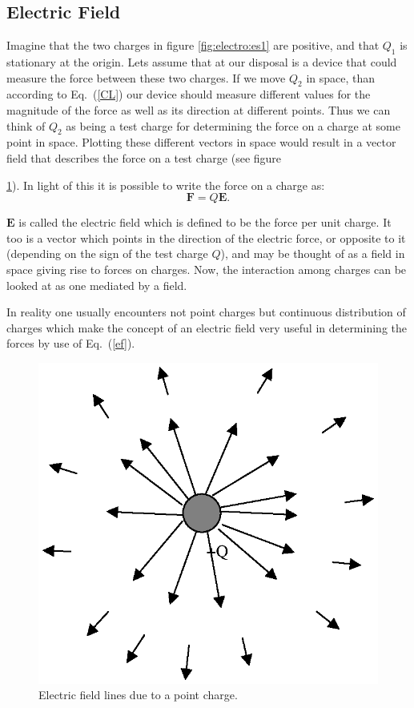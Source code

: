 \subsection{Electric Field}
Imagine that the two charges in figure \ref{fig:electro:es1} are positive, and
that $Q_1$ is stationary at the origin.  Lets assume that at our
disposal is a device that could measure the force between these
two charges. If we move $Q_2$ in space, than according to
Eq.~(\ref{CL}) our device should measure different values for the
magnitude of the force as well as its direction at different
points. Thus we can think of $Q_2$ as being a test charge for
determining the force on a charge at some point in space. Plotting
these different vectors in space would result in a vector field
that describes the force on a test charge (see figure {\ref{es2}).
In light of this it is possible to write the force on a charge as:
\begin{equation}
{\mathbf{F}}=Q{\mathbf{E}}\label{ef}.
\end{equation}

$\mathbf{E}$ is called the electric field which is defined to be
the force per unit charge.  It too is a vector which points in the
direction of the electric force, or opposite to it (depending on the sign of the test charge $Q$), and may be thought of as a field
in space giving rise to forces on charges.  Now, the interaction
among charges can be looked at as one mediated by a field.

In reality one usually encounters not point charges but
continuous distribution of charges which make the concept of an
electric field very useful in determining the forces by use of
Eq.~(\ref{ef}).
\begin{figure}[!htb]
\centering
\epsfxsize=6cm \includegraphics[scale=0.4]{1_electro/es2.eps}
\caption{Electric field lines due to a point charge.}
 \label{es2}
\end{figure}

}

